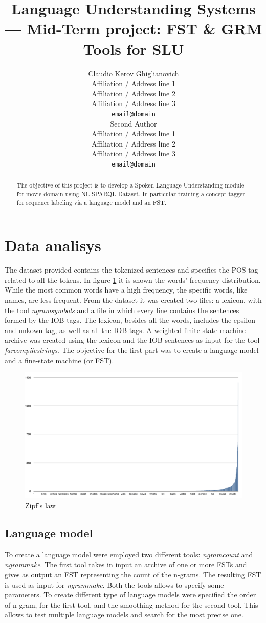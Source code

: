 \documentclass[11pt,a4paper]{article}
\title{Language Understanding Systems --- Mid-Term project: FST \& GRM Tools for SLU}
\author{Claudio Kerov Ghiglianovich \\
  Affiliation / Address line 1 \\
  Affiliation / Address line 2 \\
  Affiliation / Address line 3 \\
  {\tt email@domain} \\\And
  Second Author \\
  Affiliation / Address line 1 \\
  Affiliation / Address line 2 \\
  Affiliation / Address line 3 \\
  {\tt email@domain} \\}
\date{}
\begin{document}
\maketitle
\begin{abstract}
The objective of this project is to develop a Spoken Language Understanding module for movie domain using NL-SPARQL Dataset. In particular training a concept tagger for sequence labeling via a language model and an FST.
\end{abstract}

%
\section{Data analisys}
The dataset provided contains the tokenized sentences and specifies the POS-tag related to all the tokens.
In figure \ref{fig:unig} it is shown the words' frequency distribution. While the most common words have a high frequency, the specific words, like names, are less frequent. 
From the dataset it was created two files: a lexicon, with the tool \textit{ngramsymbols} and a file in which every line contains the sentences formed by the IOB-tags. The lexicon, besides all the words, includes the epsilon and unkown tag, as well as all the IOB-tags. A weighted finite-state machine archive was created using the lexicon and the IOB-sentences as input for the tool \textit{farcompilestrings}. The objective for the first part was to create a language model and a fine-state machine (or FST).
\begin{figure}[ht]
  \includegraphics[width=\linewidth]{img/unigram.png}
  \caption{Zipf's law}
  \label{fig:unig}
\end{figure}

\subsection*{Language model}
To create a language model were employed two different tools: \textit{ngramcount} and \textit{ngrammake}. The first tool takes in input an archive of one or more FSTs and gives as output an FST representing the count of the n-grams. The resulting FST is used as input for \textit{ngrammake}. Both the tools allows to specify some parameters. To create different type of language models were specified the order of n-gram, for the first tool, and the smoothing method for the second tool. This allows to test multiple language models and search for the most precise one.
\end{document}
